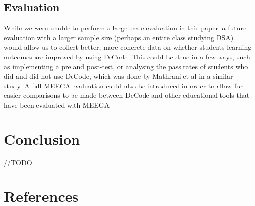 \documentclass[10pt]{article}
\begin{document}
\subsection{Evaluation}
While we were unable to perform a large-scale evaluation in this paper, a future evaluation with a larger sample size (perhaps an entire class studying DSA) would allow us to collect better, more concrete data on whether students learning outcomes are improved by using DeCode. This could be done in a few ways, such as implementing a pre and post-test, or analysing the pass rates of students who did and did not use DeCode, which was done by Mathrani et al\cite{mathrani} in a similar study. A full MEEGA\cite{Rafael} evaluation could also be introduced in order to allow for easier comparisons to be made between DeCode and other educational tools that have been evaluated with MEEGA.
\section{Conclusion}
//TODO
\begingroup

\section*{References}
  \vspace{2mm}

  \renewcommand{\section}[2]{}

  \begin{spacing}{1.0}

    
    \small
    

  \end{spacing}

\endgroup
\end{document}
